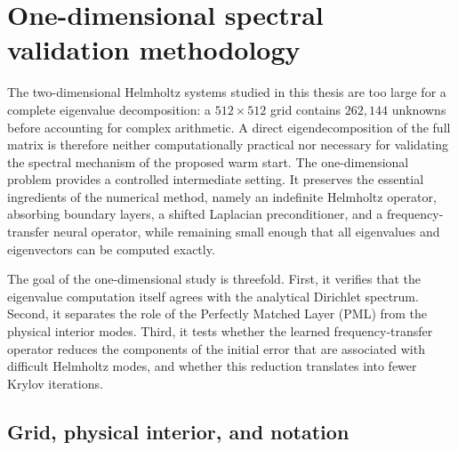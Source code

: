 %
%

\section{One-dimensional spectral validation methodology}
\label{sec:methodology_1d_spectral}

The two-dimensional Helmholtz systems studied in this thesis are too large for
a complete eigenvalue decomposition: a $512 \times 512$ grid contains
$262{,}144$ unknowns before accounting for complex arithmetic. A direct
eigendecomposition of the full matrix is therefore neither computationally
practical nor necessary for validating the spectral mechanism of the proposed
warm start. The one-dimensional problem provides a controlled intermediate
setting. It preserves the essential ingredients of the numerical method,
namely an indefinite Helmholtz operator, absorbing boundary layers, a shifted
Laplacian preconditioner, and a frequency-transfer neural operator, while
remaining small enough that all eigenvalues and eigenvectors can be computed
exactly.

The goal of the one-dimensional study is threefold. First, it verifies that
the eigenvalue computation itself agrees with the analytical Dirichlet
spectrum. Second, it separates the role of the Perfectly Matched Layer (PML)
from the physical interior modes. Third, it tests whether the learned
frequency-transfer operator reduces the components of the initial error that
are associated with difficult Helmholtz modes, and whether this reduction
translates into fewer Krylov iterations.


\subsection{Grid, physical interior, and notation}
\label{subsec:methodology_1d_grid}

